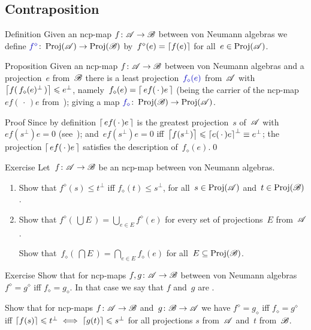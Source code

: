 \documentclass[a]{subfiles}
\begin{document}
\subsection{Contraposition}
\begin{parsec}%
\begin{point}{Definition}%
Given an ncp-map $f\colon \mathscr{A}\to\mathscr{B}$
between von Neumann algebras
we define
$\Define{f^\diamond}\colon \Proj(\scrA)\to \Proj(\scrB)$
by~$f^\diamond(e)=\left\lceil f(e)\right\rceil$
for all~$e\in\operatorname{Proj}(\mathscr{A})$.
\end{point}
\begin{point}{Proposition}%
Given an ncp-map $f\colon \mathscr{A}\to\mathscr{B}$
between von Neumann algebras
and a projection~$e$ from~$\mathscr{B}$
there is a least projection~$\Define{f_\diamond(e)}$ from~$\mathscr{A}$ 
with~$\left\lceil f(\,f_\diamond(e)^\perp\,)\right\rceil\leqslant e^\perp$,
namely~$f_\diamond(e) =\left\lceil\,ef(\,\cdot\,)e\,\right\rceil$
(being the carrier 
of the ncp-map $ef(\,\cdot\,)e$ from~);
giving a map $\Define{f_\diamond}\colon \Proj(\scrB)\to\Proj(\scrA)$.

\begin{point}{Proof}%
Since by definition $\left\lceil\,ef(\,\cdot\,)e\,\right\rceil$
is the greatest projection~$s$ of~$\mathscr{A}$
with $ef(s^\perp)e=0$ (see~);
and~$ef(s^\perp )e=0$ iff~$\left\lceil f(s^\perp)\right\rceil
\leqslant\left\lceil e(\,\cdot\,)e\right\rceil^\perp\equiv
e^\perp$;
the projection
$\left\lceil\,ef(\,\cdot\,)e\,\right\rceil$
satisfies the description of~$f_\diamond(e)$.\qed
\end{point}
\end{point}
\begin{point}{Exercise}%
Let~$f\colon \mathscr{A}\to\mathscr{B}$ be an ncp-map between von Neumann algebras.
\begin{enumerate}
\item
Show that $f^\diamond(s)\leq t^\perp$
iff $f_\diamond(t)\leq s^\perp$,
for all~$s\in\operatorname{Proj}(\mathscr{A})$ and~$t\in\operatorname{Proj}(\mathscr{B})$.
\item
Show that $f^\diamond(\,\bigcup E\,)
= \bigcup_{e\in E} f^\diamond(e)$
for every set of projections~$E$ from~$\mathscr{A}$.

Show that~$f_\diamond(\,\bigcap E\,)
= \bigcap_{e\in E} f_\diamond(e)$
for all~$E\subseteq \operatorname{Proj}(\mathscr{B})$.
\end{enumerate}
\end{point}
\begin{point}{Exercise}%
Show that for ncp-maps $f,g\colon\mathscr{A}\to\mathscr{B}$
between von Neumann algebras $f^\diamond = g^\diamond$
iff $f_\diamond = g_\diamond$.
In that case we say that $f$ and~$g$ are .
\begin{point}%
Show that for ncp-maps $f\colon \mathscr{A}\to\mathscr{B}$
and~$g\colon \mathscr{B}\to\mathscr{A}$ we have
$f^\diamond=g_\diamond$ iff $f_\diamond = g^\diamond$
iff $\left\lceil f(s)\right\rceil\leqslant t^\perp\iff \left\lceil g(t)\right\rceil\leqslant s^\perp$
for all projections $s$ from~$\mathscr{A}$ and~$t$ from~$\mathscr{B}$.


\end{point}
\end{point}
\end{parsec}
\end{document}
